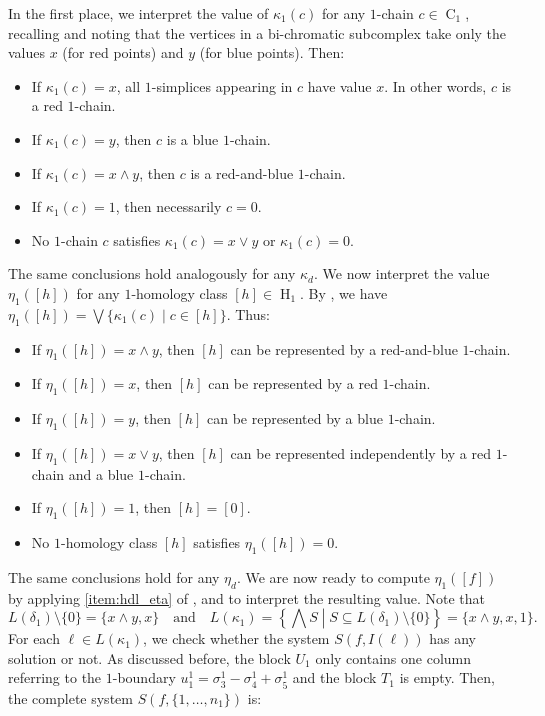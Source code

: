 \documentclass[a4paper,10pt]{article}
\DeclareMathOperator{\Co}{C}
\DeclareMathOperator{\Ho}{H}
\begin{document}
In the first place, we interpret the value of \(\kappa_1(c)\) for any \(1\)-chain \(c \in \Co_1\), recalling  and noting that the vertices in a bi-chromatic subcomplex take only the values \(x\) (for red points) and \(y\) (for blue points). Then:
\begin{itemize}
\item[--] If \(\kappa_1(c)=x\), all \(1\)-simplices appearing in \(c\) have value \(x\). In other words, \(c\) is a red \(1\)-chain.
\item[--] If \(\kappa_1(c)=y\), then \(c\) is a blue \(1\)-chain.
\item[--] If \(\kappa_1(c)=x \wedge y\), then \(c\) is a red-and-blue \(1\)-chain.
\item[--] If \(\kappa_1(c)=1\), then necessarily \(c=0\).
\item[--] No \(1\)-chain \(c\) satisfies \(\kappa_1(c)=x \vee y\) or \(\kappa_1(c)=0\).
\end{itemize}
The same conclusions hold analogously for any \(\kappa_d\). We now interpret the value \(\eta_1([h])\) for any \(1\)-homology class \([h]\in \Ho_1\). By , we have \(\eta_1([h])=\bigvee \{\kappa_1(c) \mid c \in [h]\}\). Thus:
\begin{itemize}
\item[--] If \(\eta_1([h])=x \wedge y\), then \([h]\) can be represented by a red-and-blue \(1\)-chain.
\item[--] If \(\eta_1([h])=x\), then \([h]\) can be represented by a red \(1\)-chain.
\item[--] If \(\eta_1([h])=y\), then \([h]\) can be represented by a blue \(1\)-chain.
\item[--] If \(\eta_1([h])=x \vee y\), then \([h]\) can be represented independently by a red \(1\)-chain and a blue \(1\)-chain.
\item[--] If \(\eta_1([h])=1\), then \([h]=[0]\).
\item[--] No \(1\)-homology class \([h]\) satisfies \(\eta_1([h])=0\).
\end{itemize}
The same conclusions hold for any \(\eta_d\). We are now ready to compute \(\eta_1([f])\) by applying \cref{item:hdl_eta} of , and to interpret the resulting value. Note that 
\[
L(\delta_1) \setminus \{0\} = \{x\wedge y, x\} \quad \text{and} \quad L(\kappa_1) = \left\{\bigwedge S \middle | S \subseteq L(\delta_1)\setminus \{0\}\right\}=  \{x\wedge y, x, 1\}.
\]
For each \(\ell \in L(\kappa_1)\), we check whether the system \(S(f,I(\ell))\) has any solution or not. As discussed before, the block \(U_1\) only contains one column referring to the \(1\)-boundary \(u^{1}_{1} = \sigma^{1}_{3}- \sigma^{1}_{4}+ \sigma^{1}_{5}\) and the block \(T_1\) is empty. Then, the complete system \(S(f,\{1,\dots,n_1\})\) is:
\end{document}
